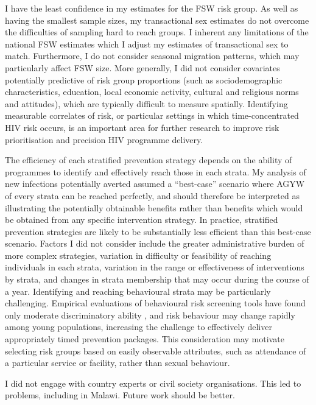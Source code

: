 \documentclass[a4paper, nobind]{templates/ociamthesis}
\begin{document}
I have the least confidence in my estimates for the FSW risk group.
As well as having the smallest sample sizes, my transactional sex estimates do not overcome the difficulties of sampling hard to reach groups.
I inherent any limitations of the national FSW estimates \autocite{stevens2022estimating} which I adjust my estimates of transactional sex to match.
Furthermore, I do not consider seasonal migration patterns, which may particularly affect FSW size.
More generally, I did not consider covariates potentially predictive of risk group proportions (such as sociodemographic characteristics, education, local economic activity, cultural and religious norms and attitudes), which are typically difficult to measure spatially.
Identifying measurable correlates of risk, or particular settings in which time-concentrated HIV risk occurs, is an important area for further research to improve risk prioritisation and precision HIV programme delivery.

The efficiency of each stratified prevention strategy depends on the ability of programmes to identify and effectively reach those in each strata.
My analysis of new infections potentially averted assumed a ``best-case'' scenario where AGYW of every strata can be reached perfectly, and should therefore be interpreted as illustrating the potentially obtainable benefits rather than benefits which would be obtained from any specific intervention strategy.
In practice, stratified prevention strategies are likely to be substantially less efficient than this best-case scenario.
Factors I did not consider include the greater administrative burden of more complex strategies, variation in difficulty or feasibility of reaching individuals in each strata, variation in the range or effectiveness of interventions by strata, and changes in strata membership that may occur during the course of a year.
Identifying and reaching behavioural strata may be particularly challenging.
Empirical evaluations of behavioural risk screening tools have found only moderate discriminatory ability \autocite{jia2022risk}, and risk behaviour may change rapidly among young populations, increasing the challenge to effectively deliver appropriately timed prevention packages.
This consideration may motivate selecting risk groups based on easily observable attributes, such as attendance of a particular service or facility, rather than sexual behaviour.

I did not engage with country experts or civil society organisations.
This led to problems, including in Malawi.
Future work should be better.
\end{document}

